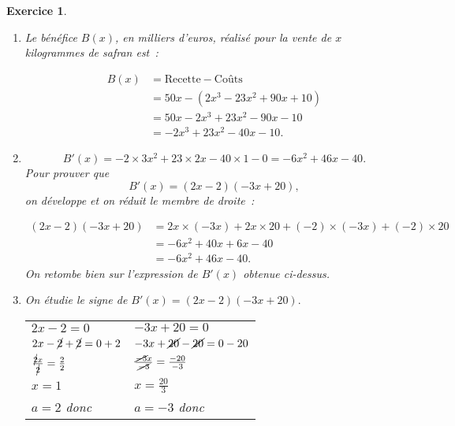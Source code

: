 \documentclass[10pt]{article}
\newtheorem{exo}{Exercice}
\begin{document}
\begin{exo}
\begin{enumerate}
\item  Le bénéfice $B(x)$, en milliers d'euros, réalisé pour la vente de $x$
kilogrammes de safran est~: 

\begin{align*}
B(x)&=\text{Recette}-\text{Coûts}\\
&=50x-\left(2x^3 - 23x^2 + 90x + 10\right)\\
&=50x-2x^3+23x^2-90x-10\\
&=-2x^3+23x^2-40x-10.\end{align*}

\item \[B'(x)=-2\times 3x^2+23\times 2x-40\times 1-0=-6x^2+46x-40.\]
 Pour prouver que
\[B'(x)=(2x-2)(-3x+20),\] on développe et on réduit le membre de droite~:

\begin{align*}
(2x-2)(-3x+20)&=2x\times (-3x)+2x\times 20+(-2)\times (-3x) +(-2)\times 20\\
&=-6x^2+40x+6x-40\\
&=-6x^2+46x-40.\end{align*} On retombe bien sur l'expression de $B'(x)$ obtenue ci-dessus.
		\item On étudie le signe de $B'(x)=(2x-2)(-3x+20).$

\medskip

{\setlength{\arrayrulewidth}{2pt}
\begin{center}
\begin{tabular}{l|l}
$2x-2=0$&$-3x+20=0$\\
$2x-\cancel{2}+\cancel{2}=0+2$&$-3x+\cancel{20}-\cancel{20}=0-20$\\
$\frac{\cancel{2}x}{\cancel{2}}=\frac{2}{2}$&$\frac{\cancel{-3}x}{\cancel{-3}}=\frac{-20}{-3}$\\
$x=1$&$x=\frac{20}{3}$ \\
$a=2$ donc \fbox{$-~\upphi~+$}&$a=-3$ donc \fbox{$+~\upphi~-$}
\end{tabular}
\end{center}}

\medskip


\begin{center}
\end{center}


\end{enumerate}
\end{exo}
\end{document}
